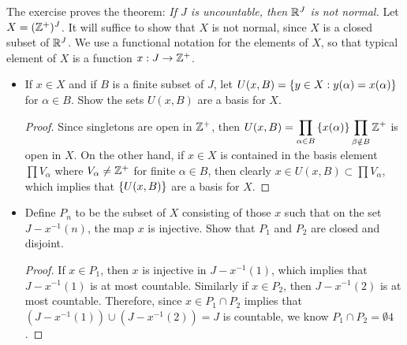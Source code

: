 \documentclass[12pt,a4paper]{article}
\begin{document}
    \begin{ex}
        The exercise proves the theorem: \textit{If $J$ is uncountable, then $\mathbb{R}^J$ is not normal.}
        Let $X=(\mathbb{Z}^+)^J$. It will suffice to show that $X$ is not normal, since $X$ is a closed subset of $\mathbb{R}^J$. We use a functional notation for the elements of $X$, so that typical element of $X$ is a function $x:J\to\mathbb{Z}^+$.
        \begin{itemize}
            \item If $x\in X$ and if $B$ is a finite subset of $J$, let $U(x,B)=\left\{y\in X:y(\alpha)=x(\alpha)\right\}$ for $\alpha\in B$. Show the sets $U(x,B)$ are a basis for $X$.
            \begin{proof}
                Since singletons are open in $\mathbb{Z}^+$, then $U(x,B)=\displaystyle\prod_{\alpha\in B}\left\{x(\alpha)\right\} \prod_{\beta\notin B}\mathbb{Z}^+$ is open in $X$. On the other hand, if $x\in X$ is contained in the basis element $\prod V_\alpha$ where $V_\alpha\neq\mathbb{Z}^+$ for finite $\alpha\in B$, then clearly $x\in U(x,B)\subset\prod V_\alpha$, which implies that $\left\{U(x,B)\right\}$ are a basis for $X$.
            \end{proof}
            \item Define $P_n$ to be the subset of $X$ consisting of those $x$ such that on the set $J-x^{-1}(n)$, the map $x$ is injective. Show that $P_1$ and $P_2$ are closed and disjoint.
            \begin{proof}
                If $x\in P_1$, then $x$ is injective in $J-x^{-1}(1)$, which implies that $J-x^{-1}(1)$ is at most countable. Similarly if $x\in P_2$, then $J-x^{-1}(2)$ is at most countable. Therefore, since $x\in P_1\cap P_2$ implies that $(J-x^{-1}(1))\cup(J-x^{-1}(2))=J$ is countable, we know $P_1\cap P_2=\emptyset4$.


\end{proof}
\end{itemize}
\end{ex}
\end{document}
